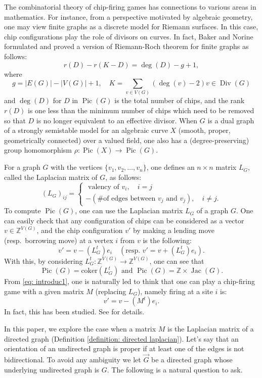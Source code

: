 \documentclass[11pt,reqno]{amsart}
\DeclareMathOperator{\Pic}{Pic}
\DeclareMathOperator{\Jac}{Jac}
\DeclareMathOperator{\Div}{Div}
\theoremstyle{definition}
\theoremstyle{plain}
\begin{document}
The combinatorial theory of chip-firing games has connections to various areas in mathematics. For instance, from a perspective motivated by algebraic geometry, one may view finite graphs as a discrete model for Riemann surfaces. In this case, chip configurations play the role of divisors on curves. In fact, Baker and Norine \cite{baker2007riemann} formulated and proved a version of Riemann-Roch theorem for finite graphs as follows:
\[
r(D) - r(K-D) = \deg(D) -g+1,
\]
where
\[
g=|E(G)|-|V(G)|+1, \quad K=\sum_{v \in V(G)} (\deg(v)-2)v \in \Div(G)
\]
and $\deg(D)$ for $D$ in $\Pic(G)$ is the total number of chips, and the rank $r(D)$ is one less than the minimum number of chips which need to be removed so that $D$ is no longer equivalent to an effective divisor. When $G$ is a dual graph of a strongly semistable model for an algebraic curve $X$ (smooth, proper, geometrically connected) over a valued field, one also has a (degree-preserving) group homomorphism $\rho:\Pic(X) \to \Pic(G)$. 

For a graph $G$ with the vertices $\{v_1,v_2,\dots,v_n\}$, one defines an $n\times n$ matrix $L_G$, called the Laplacian matrix of $G$, as follows:
\[
(L_G)_{ij}=\begin{cases}
\textrm{ valency of $v_i$}, \quad i=j\\
-(\textrm{\# of edges between $v_j$ and $v_j$}), \quad i \neq j.
\end{cases}
\]
To compute $\Pic(G)$, one can use the Laplacian matrix $L_G$ of a graph $G$. One can easily check that any configuration of chips can be considered as a vector $v \in \mathbb{Z}^{V(G)}$, and the chip configuration $v'$ by making a lending move (resp.~borrowing move) at a vertex $i$ from $v$ is the following:
\begin{equation}\label{eq: introduc1}
v'=v - (L_G^t)e_i \quad (\textrm{resp.~} v'=v + (L_G^t)e_i).
\end{equation}
With this, by considering $L_G^t:\mathbb{Z}^{V(G)} \to \mathbb{Z}^{V(G)}$, one can see that
\[
\Pic(G)=\textrm{coker}(L_G^t) \textrm{ and } \Pic(G)=\mathbb{Z}\times \Jac(G).
\]
From \eqref{eq: introduc1}, one is naturally led to think that one can play a chip-firing game with a given matrix $M$ (replacing $L_G$), namely firing at a site $i$ is:
\begin{equation}\label{eq: introduc2}
v'=v - (M^t)e_i.
\end{equation}
In fact, this has been studied. See \cite[Section 6]{klivans2018mathematics} for details. 

In this paper, we explore the case when a matrix $M$ is the Laplacian matrix of a directed graph (Definition \ref{definition: directed laplacian}). Let's say that an orientation of an undirected graph is proper if at least one of the edges is not bidirectional. To avoid any ambiguity we let $\vec{G}$ be a directed graph whose underlying undirected graph is $G$. The following is a natural question to ask. 
\end{document}
